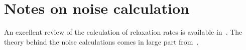 \documentclass[11pt]{article}
\begin{document}

	\section{Notes on noise calculation} \label{sec:NoiseCalc}
	An excellent review of the calculation of relaxation rates is available in~\cite{Henkel1999}.
	The theory behind the noise calculations comes in large part from~\cite{Agarwal1975}.

	\newpage
	\listoftodos
	\newpage
	\printbibliography
\end{document}
